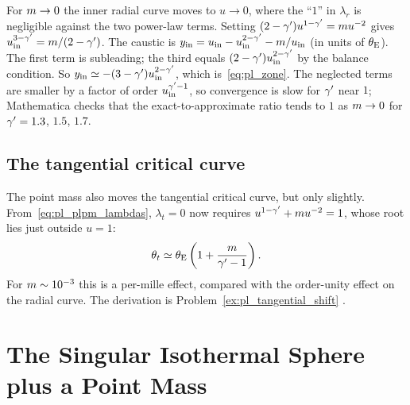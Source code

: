 \begin{derivation}
For $m\to0$ the inner radial curve moves to $u\to0$, where the
``$1$'' in $\lambda_r$ is negligible against the two power-law terms.
Setting $(2-\gamma')u^{1-\gamma'}=m u^{-2}$ gives
$u_{\rm in}^{3-\gamma'}=m/(2-\gamma')$.  The caustic is
$y_{\rm in}=u_{\rm in}-u_{\rm in}^{2-\gamma'}-m/u_{\rm in}$ (in units of
$\theta_{\mathrm{E}}$).  The first term is subleading; the third equals
$(2-\gamma')u_{\rm in}^{2-\gamma'}$ by the balance condition.  So
$y_{\rm in}\simeq-(3-\gamma')u_{\rm in}^{2-\gamma'}$, which
is~\eqref{eq:pl_zone}.  The neglected terms are smaller by a factor of
order $u_{\rm in}^{\gamma'-1}$, so convergence is slow for $\gamma'$ near $1$;
Mathematica checks that the exact-to-approximate ratio tends to $1$ as
$m\to0$ for $\gamma'=1.3$, $1.5$, $1.7$.
\end{derivation}

\subsection{The tangential critical curve}

The point mass also moves the tangential critical curve, but only
slightly.  From~\eqref{eq:pl_plpm_lambdas}, $\lambda_t=0$ now requires
$u^{1-\gamma'}+m u^{-2}=1$, whose root lies just outside $u=1$:
\begin{equation}
    \theta_t \simeq \theta_{\mathrm{E}}\left(1+\frac{m}{\gamma'-1}\right) .
    \label{eq:pl_theta_t_shift}
\end{equation}
For $m\sim10^{-3}$ this is a per-mille effect, compared with the
order-unity effect on the radial curve.  The derivation is
Problem~\ref{ex:pl_tangential_shift} .


\section{The Singular Isothermal Sphere plus a Point Mass}
\label{sec:pl_sis_pm}

